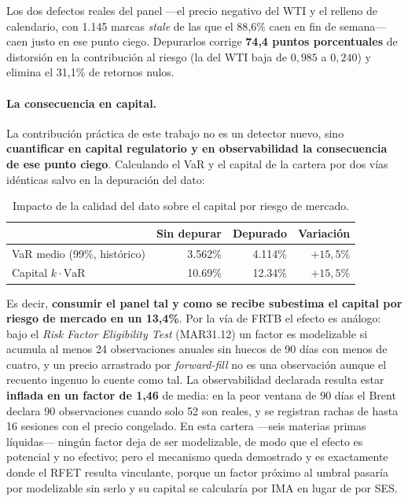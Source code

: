 \documentclass[11pt,a4paper]{article}
\begin{document}
Los dos defectos reales del panel —el precio negativo del WTI y el relleno de
calendario, con 1.145 marcas \emph{stale} de las que el 88{,}6\% caen en fin de
semana— caen justo en ese punto ciego. Depurarlos corrige \textbf{74{,}4 puntos
porcentuales} de distorsión en la contribución al riesgo (la del WTI baja de
$0{,}985$ a $0{,}240$) y elimina el 31{,}1\% de retornos nulos.

\paragraph{La consecuencia en capital.}
\label{par:capital}
La contribución práctica de este trabajo no es un detector nuevo, sino
\textbf{cuantificar en capital regulatorio y en observabilidad la consecuencia de
ese punto ciego}. Calculando el VaR y el capital de la cartera por dos vías
idénticas salvo en la depuración del dato:

\begin{table}[H]
\centering
\footnotesize
\caption{Impacto de la calidad del dato sobre el capital por riesgo de mercado.}
\label{tab:dqcapital}
\begin{tabular}{lrrr}
\toprule
& \textbf{Sin depurar} & \textbf{Depurado} & \textbf{Variación} \\
\midrule
VaR medio (99\%, histórico) & 3.562\% & 4.114\% & $+15{,}5\%$ \\
Capital $k\cdot\mathrm{VaR}$ & 10.69\% & 12.34\% & $+15{,}5\%$ \\
\bottomrule
\end{tabular}
\end{table}

Es decir, \textbf{consumir el panel tal y como se recibe subestima el capital por
riesgo de mercado en un 13{,}4\%}. Por la vía de FRTB el efecto es análogo: bajo
el \emph{Risk Factor Eligibility Test} (MAR31.12) un factor es modelizable si
acumula al menos 24 observaciones anuales sin huecos de 90 días con menos de
cuatro, y un precio arrastrado por \emph{forward-fill} no es una observación
aunque el recuento ingenuo lo cuente como tal. La observabilidad declarada
resulta estar \textbf{inflada en un factor de 1{,}46} de media: en la peor
ventana de 90 días el Brent declara 90 observaciones cuando solo 52 son reales, y
se registran rachas de hasta 16 sesiones con el precio congelado. En esta cartera
—seis materias primas líquidas— ningún factor deja de ser modelizable, de modo
que el efecto es potencial y no efectivo; pero el mecanismo queda demostrado y es
exactamente donde el RFET resulta vinculante, porque un factor próximo al umbral
pasaría por modelizable sin serlo y su capital se calcularía por IMA en lugar de
por SES.
\end{document}
